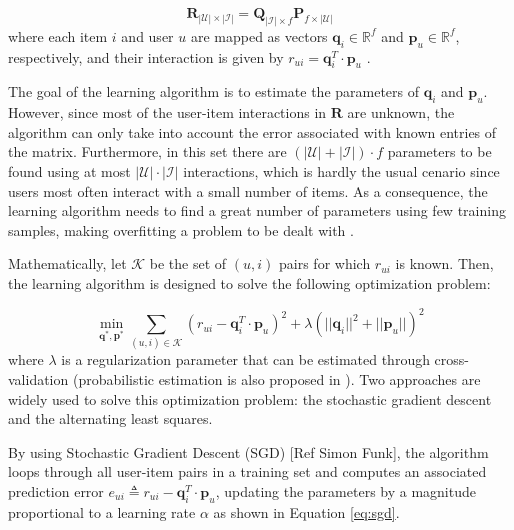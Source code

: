     \begin{equation}
        \label{eq:MF}
        \mathbf{R_{|\mathcal{U}| \times |\mathcal{I}|}} = \mathbf{Q}_{|\mathcal{I}| \times f} \mathbf{P}_{f \times |\mathcal{U}|} 
    \end{equation} where each item $i$ and user $u$ are mapped as vectors $\mathbf{q}_i \in \mathbb{R}^f$ and $\mathbf{p}_u \in \mathbb{R}^f$, respectively, and their interaction is given by $r_{ui} = \mathbf{q}^T_i \cdot \mathbf{p}_u$ \cite{2009MFTechniques}.
    
    The goal of the learning algorithm is to estimate the parameters of  $\mathbf{q}_i$ and $\mathbf{p}_u$. However, since most of the user-item interactions in $\mathbf{R}$ are unknown, the algorithm can only take into account the error associated with known entries of the matrix. Furthermore, in this set there are $(|\mathcal{U}|+|\mathcal{I}|)\cdot f$ parameters to be found using at most $|\mathcal{U}|\cdot |\mathcal{I}|$ interactions, which is hardly the usual cenario since users most often interact with a small number of items. As a consequence, the learning algorithm needs to find a great number of parameters using few training samples, making overfitting a problem to be dealt with \cite{2008ALSWR}.
    
    Mathematically, let $\mathcal{K}$ be the set of $(u,i)$ pairs for which $r_{ui}$ is known. Then, the learning algorithm is designed to solve the following optimization problem: 
    
    \begin{equation}
        \label{eq:mf_min}
        \min_{\mathbf{q}^*, \mathbf{p}^*} \sum_{(u,i) \in \mathcal{K}} (r_{ui} - \mathbf{q}^T_i \cdot \mathbf{p}_u)^2 + \lambda (||\mathbf{q}_i||^2 + ||\mathbf{p}_u||)^2
    \end{equation} where $\lambda$ is a regularization parameter that can be estimated through cross-validation (probabilistic estimation is also proposed in \cite{2007ProbMF}). Two approaches are widely used to solve this optimization problem: the stochastic gradient descent and the alternating least squares. 
    
    By using Stochastic Gradient Descent (SGD) [Ref Simon Funk], the algorithm loops through all user-item pairs in a training set and computes an associated prediction error $e_{ui} \triangleq r_{ui} - \mathbf{q}^T_i \cdot \mathbf{p}_u$, updating the parameters by a magnitude proportional to a learning rate $\alpha$ as shown in Equation \ref{eq:sgd}.
    
